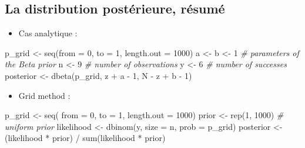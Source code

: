 \documentclass[
  a4paper,11pt,twoside,onecolumn,openright,final,oldfontcommands]{memoir}
\newenvironment{Shaded}{\begin{snugshade}}{\end{snugshade}}
\newcommand{\AttributeTok}[1]{\textcolor[rgb]{0.77,0.63,0.00}{#1}}
\newcommand{\CommentTok}[1]{\textcolor[rgb]{0.56,0.35,0.01}{\textit{#1}}}
\newcommand{\DecValTok}[1]{\textcolor[rgb]{0.00,0.00,0.81}{#1}}
\newcommand{\FunctionTok}[1]{\textcolor[rgb]{0.00,0.00,0.00}{#1}}
\newcommand{\NormalTok}[1]{#1}
\newcommand{\OtherTok}[1]{\textcolor[rgb]{0.56,0.35,0.01}{#1}}
\newcommand{\SpecialCharTok}[1]{\textcolor[rgb]{0.00,0.00,0.00}{#1}}
\providecommand{\tightlist}{%
  \setlength{\itemsep}{0pt}\setlength{\parskip}{0pt}}
\theoremstyle{definition}
\theoremstyle{definition}
\theoremstyle{definition}
\theoremstyle{definition}
\theoremstyle{remark}
\begin{document}
\hypertarget{la-distribution-postuxe9rieure-ruxe9sumuxe9}{%
\subsection{La distribution postérieure, résumé}\label{la-distribution-postuxe9rieure-ruxe9sumuxe9}}

\begin{itemize}
\tightlist
\item
  Cas analytique :
\end{itemize}

\begin{Shaded}
\begin{Highlighting}[]
\NormalTok{p\_grid }\OtherTok{\textless{}{-}} \FunctionTok{seq}\NormalTok{(}\AttributeTok{from =} \DecValTok{0}\NormalTok{, }\AttributeTok{to =} \DecValTok{1}\NormalTok{, }\AttributeTok{length.out =} \DecValTok{1000}\NormalTok{)}
\NormalTok{a }\OtherTok{\textless{}{-}}\NormalTok{ b }\OtherTok{\textless{}{-}} \DecValTok{1} \CommentTok{\# parameters of the Beta prior}
\NormalTok{n }\OtherTok{\textless{}{-}} \DecValTok{9} \CommentTok{\# number of observations}
\NormalTok{y }\OtherTok{\textless{}{-}} \DecValTok{6} \CommentTok{\# number of successes}
\NormalTok{posterior }\OtherTok{\textless{}{-}} \FunctionTok{dbeta}\NormalTok{(p\_grid, z }\SpecialCharTok{+}\NormalTok{ a }\SpecialCharTok{{-}} \DecValTok{1}\NormalTok{, N }\SpecialCharTok{{-}}\NormalTok{ z }\SpecialCharTok{+}\NormalTok{ b }\SpecialCharTok{{-}} \DecValTok{1}\NormalTok{)}
\end{Highlighting}
\end{Shaded}

\begin{itemize}
\tightlist
\item
  Grid method :
\end{itemize}

\begin{Shaded}
\begin{Highlighting}[]
\NormalTok{p\_grid }\OtherTok{\textless{}{-}} \FunctionTok{seq}\NormalTok{( }\AttributeTok{from =} \DecValTok{0}\NormalTok{, }\AttributeTok{to =} \DecValTok{1}\NormalTok{, }\AttributeTok{length.out =} \DecValTok{1000}\NormalTok{)}
\NormalTok{prior }\OtherTok{\textless{}{-}} \FunctionTok{rep}\NormalTok{(}\DecValTok{1}\NormalTok{, }\DecValTok{1000}\NormalTok{) }\CommentTok{\# uniform prior}
\NormalTok{likelihood }\OtherTok{\textless{}{-}} \FunctionTok{dbinom}\NormalTok{(y, }\AttributeTok{size =}\NormalTok{ n, }\AttributeTok{prob =}\NormalTok{ p\_grid)}
\NormalTok{posterior }\OtherTok{\textless{}{-}}\NormalTok{ (likelihood }\SpecialCharTok{*}\NormalTok{ prior) }\SpecialCharTok{/} \FunctionTok{sum}\NormalTok{(likelihood }\SpecialCharTok{*}\NormalTok{ prior)}
\end{Highlighting}
\end{Shaded}
\end{document}
